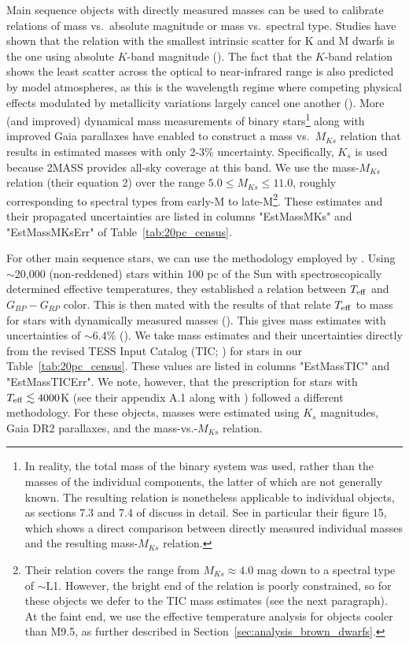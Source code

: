 \documentclass[twocolumn,tighten,twocolappendix]{aastex631}
\begin{document}
Main sequence objects with directly measured masses can be used to calibrate relations of mass vs.\ absolute magnitude or mass vs.\ spectral type. Studies have shown that the relation with the smallest intrinsic scatter for K and M dwarfs is the one using absolute $K$-band magnitude (\citealt{delfosse2000}). The fact that the $K$-band relation shows the least scatter across the optical to near-infrared range is also predicted by model atmospheres, as this is the wavelength regime where competing physical effects modulated by metallicity variations largely cancel one another (\citealt{delfosse2000,mann2019}). More (and improved) dynamical mass measurements of binary stars\footnote{In reality, the total mass of the binary system was used, rather than the masses of the individual components, the latter of which are not generally known. The resulting relation is nonetheless applicable to individual objects, as sections 7.3 and 7.4 of \cite{mann2019} discuss in detail. See in particular their figure 15, which shows a direct comparison between directly measured individual masses and the resulting mass-$M_{Ks}$ relation.} along with improved Gaia parallaxes have enabled \cite{mann2019} to construct a mass vs.\ $M_{Ks}$ relation that results in estimated masses with only 2-3\% uncertainty. Specifically, $K_s$ is used because 2MASS provides all-sky coverage at this band. We use the \cite{mann2019} mass-$M_{Ks}$ relation (their equation 2) over the range $5.0 \le M_{Ks} \le 11.0$, roughly corresponding to spectral types from early-M to late-M\footnote{Their relation covers the range from $M_{Ks} \approx 4.0$ mag down to a spectral type of $\sim$L1. However, the bright end of the relation is poorly constrained, so for these objects we defer to the TIC mass estimates (see the next paragraph). At the faint end, we use the effective temperature analysis for objects cooler than M9.5, as further described in Section~\ref{sec:analysis_brown_dwarfs}.}. These estimates and their propagated uncertainties are listed in columns "EstMassMKs" and "EstMassMKsErr" of Table~\ref{tab:20pc_census}.

For other main sequence stars, we can use the methodology employed by \cite{stassun2019}. Using $\sim$20,000 (non-reddened) stars within 100 pc of the Sun with spectroscopically determined effective temperatures, they established a relation between $T_{\rm eff}$ and $G_{BP}-G_{RP}$ color. This is then mated with the results of \cite{torres2010} that relate $T_{\rm eff}$ to mass for stars with dynamically measured masses (\citealt{stassun2018b}). This gives mass estimates with uncertainties of ${\sim}6.4\%$ (\citealt{stassun2019}). We take mass estimates and their uncertainties directly from the revised TESS Input Catalog (TIC; \citealt{stassun2019}) for stars in our Table~\ref{tab:20pc_census}. These values are listed in columns "EstMassTIC" and "EstMassTICErr". We note, however, that the \cite{stassun2019} prescription for stars with $T_{\rm eff} \lesssim 4000$K (see their appendix A.1 along with \citealt{muirhead2018}) followed a different methodology. For these objects, masses were estimated using $K_s$ magnitudes, Gaia DR2 parallaxes, and the \cite{mann2019} mass-vs.-$M_{Ks}$ relation. 
\end{document}
